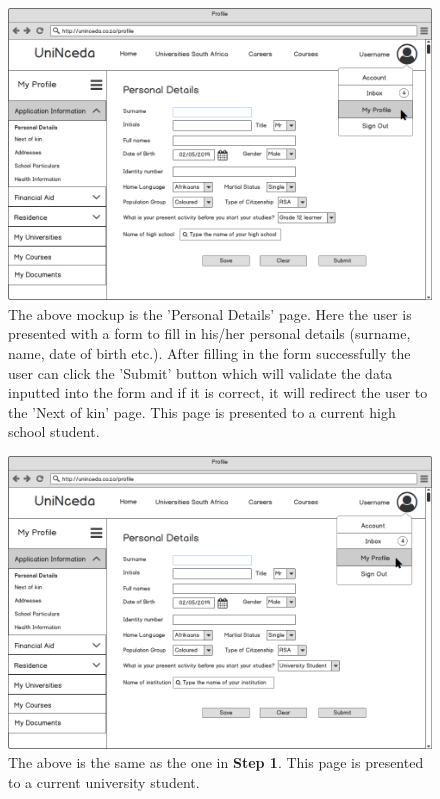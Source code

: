 \documentclass[a4paper, 12pt]{article}
\begin{document}
\begin{figure}[H]
\centering
\includegraphics[scale=0.4]{ProfileAppInfoPersonalDetailsOpt(1)}
\caption{The above mockup is the 'Personal Details' page. Here the user is presented with a form to fill in his/her personal details (surname, name, date of birth etc.). After filling in the form successfully the user can click the 'Submit' button which will validate the data inputted into the form and if it is correct, it will redirect the user to the 'Next of kin' page. This page is presented to a current high school student.}
\label{ProfileAppInfoPersonalDetailsOpt(1)}
\end{figure}

\setcounter{figure}{0}

\begin{figure}[H]
\centering
\includegraphics[scale=0.4]{ProfileAppInfoPersonalDetailsOpt(2)}
\caption{The above is the same as the one in \textbf{Step 1}. This page is presented to a current university student.}
\label{ProfileAppInfoPersonalDetailsOpt(2)}
\end{figure}
\end{document}
